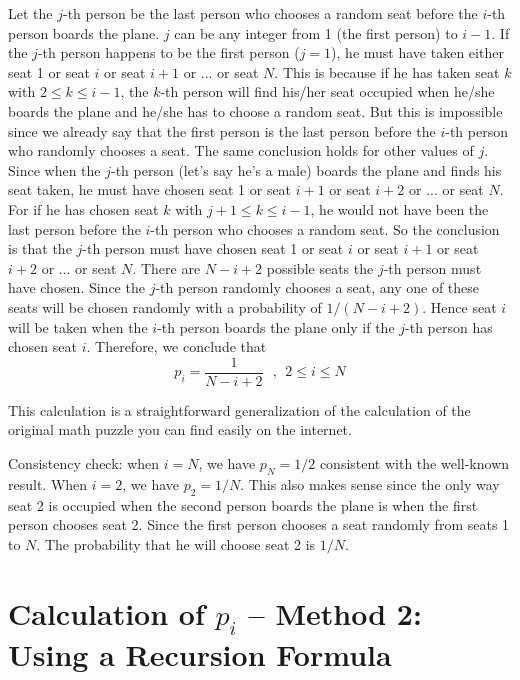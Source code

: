 \documentclass[11pt]{article}
\newcommand{\beq}{\begin{equation}}
\newcommand{\eeq}{\end{equation}}
\newcommand{\ve}[1]{\mbox{\boldmath $#1$}}
\numberwithin{equation}{section}
\begin{document}
Let the $j$-th person be the last person 
who chooses a random seat before the $i$-th person 
boards the plane. $j$ can be any integer from 1 (the first person) to $i-1$. 
If the $j$-th person happens to be the first person ($j=1$), he must have 
taken either seat 1 or seat $i$ or seat $i+1$ or ... or seat $N$. This is because 
if he has taken seat $k$ with $2 \leq k \leq i-1$, the $k$-th person 
will find his/her seat occupied when he/she boards the plane and he/she has to 
choose a random seat. But this is impossible since 
we already say that the first person is the last person before the $i$-th person 
who randomly chooses a seat. The same conclusion holds for other values of $j$. 
Since when the $j$-th person (let's say he's a male) boards the plane and finds 
his seat taken, he must have 
chosen seat 1 or seat $i+1$ or seat $i+2$ or ... or seat $N$. For if he has chosen 
seat $k$ with $j+1 \leq k \leq i-1$, he would not have been the last person before 
the $i$-th person who chooses a random seat. So the conclusion is that the $j$-th 
person must have chosen seat 1 or seat $i$ or seat $i+1$ or seat $i+2$ or ... or seat $N$. 
There are $N-i+2$ possible seats the $j$-th person must have chosen. Since 
the $j$-th person randomly chooses a seat, any one of these seats will be chosen randomly 
with a probability of $1/(N-i+2)$. Hence seat $i$ will be taken when the $i$-th person 
boards the plane only if the $j$-th person has chosen seat $i$. Therefore, we conclude that 
\beq
  \boxed{ p_i = \frac{1}{N-i+2} \ \ \ , \ \ 2 \leq i \leq N }
\eeq

This calculation is a straightforward generalization of the calculation of 
the original math puzzle you can find easily on the internet. 

Consistency check: when $i=N$, we have $p_N = 1/2$ consistent with the 
well-known result. When $i=2$, we have $p_2 = 1/N$. This also makes sense 
since the only way seat 2 is occupied when the second person boards the 
plane is when the first person chooses seat 2. Since the first person chooses 
a seat randomly from seats 1 to $N$. The probability that he will choose 
seat 2 is $1/N$.

\section{Calculation of \ve{p_i} -- Method 2: Using a Recursion Formula}
\end{document}
